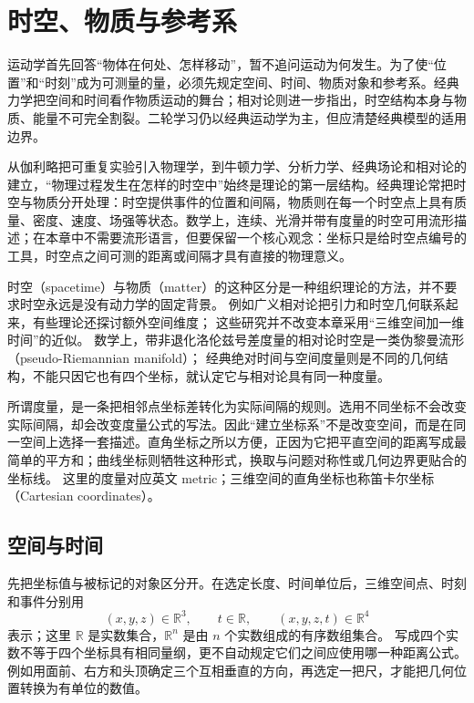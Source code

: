 \section{时空、物质与参考系}
\label{r2ch01:sec:spacetime}

运动学首先回答“物体在何处、怎样移动”，暂不追问运动为何发生。为了使“位置”和“时刻”成为可测量的量，必须先规定空间、时间、物质对象和参考系。经典力学把空间和时间看作物质运动的舞台；相对论则进一步指出，时空结构本身与物质、能量不可完全割裂。二轮学习仍以经典运动学为主，但应清楚经典模型的适用边界。

从伽利略把可重复实验引入物理学，到牛顿力学、分析力学、经典场论和相对论的建立，“物理过程发生在怎样的时空中”始终是理论的第一层结构。经典理论常把时空与物质分开处理：时空提供事件的位置和间隔，物质则在每一个时空点上具有质量、密度、速度、场强等状态。数学上，连续、光滑并带有度量的时空可用流形描述；在本章中不需要流形语言，但要保留一个核心观念：坐标只是给时空点编号的工具，时空点之间可测的距离或间隔才具有直接的物理意义。

时空（spacetime）与物质（matter）的这种区分是一种组织理论的方法，并不要求时空永远是没有动力学的固定背景。
例如广义相对论把引力和时空几何联系起来，有些理论还探讨额外空间维度；
这些研究并不改变本章采用“三维空间加一维时间”的近似。
数学上，带非退化洛伦兹号差度量的相对论时空是一类伪黎曼流形（pseudo-Riemannian manifold）；
经典绝对时间与空间度量则是不同的几何结构，不能只因它也有四个坐标，就认定它与相对论具有同一种度量。

所谓度量，是一条把相邻点坐标差转化为实际间隔的规则。选用不同坐标不会改变实际间隔，却会改变度量公式的写法。因此“建立坐标系”不是改变空间，而是在同一空间上选择一套描述。直角坐标之所以方便，正因为它把平直空间的距离写成最简单的平方和；曲线坐标则牺牲这种形式，换取与问题对称性或几何边界更贴合的坐标线。
这里的度量对应英文 metric；三维空间的直角坐标也称笛卡尔坐标（Cartesian coordinates）。

\subsection{空间与时间}
\label{r2ch01:sec:space-time-coordinates}

先把坐标值与被标记的对象区分开。在选定长度、时间单位后，三维空间点、时刻和事件分别用
\[
  (x,y,z)\in\mathbb R^3,\qquad t\in\mathbb R,
  \qquad (x,y,z,t)\in\mathbb R^4
\]
表示；这里 $\mathbb R$ 是实数集合，$\mathbb R^n$ 是由 $n$ 个实数组成的有序数组集合。
写成四个实数不等于四个坐标具有相同量纲，更不自动规定它们之间应使用哪一种距离公式。
例如用面前、右方和头顶确定三个互相垂直的方向，再选定一把尺，才能把几何位置转换为有单位的数值。

